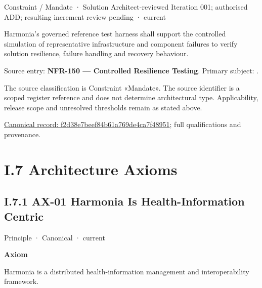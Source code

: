 \label{element:f2d38e7beef84b61a769de4ca7f48951}
{\small Constraint / Mandate · Solution Architect-reviewed Iteration 001; authorised ADD; resulting increment review pending · current}\par

Harmonia's governed reference test harness shall support the controlled simulation of representative infrastructure and component failures to verify solution resilience, failure handling and recovery behaviour.



Source entry: \textbf{NFR-150 — Controlled Resilience Testing}. Primary subject: \texttt{}.



The source classification is Constraint «Mandate». The source identifier is a scoped register reference and does not determine architectural type. Applicability, release scope and unresolved thresholds remain as stated above.


{\footnotesize \href{../../../../continuum/motivation/constraint/mandate/f2d38e7beef84b61a769de4ca7f48951.md}{Canonical record: f2d38e7beef84b61a769de4ca7f48951}; full qualifications and provenance.}\par
\chapter*{I.7 Architecture Axioms}
\label{navigation:I.7}

\section*{I.7.1 AX-01 Harmonia Is Health-Information Centric}
\label{navigation:I.7.1}

\label{element:e9bd61acaaea4577bc4086a5639e52c3}
{\small Principle · Canonical · current}\par

\par\medskip\textbf{Axiom}\par


Harmonia is a distributed health-information management and
interoperability framework.



